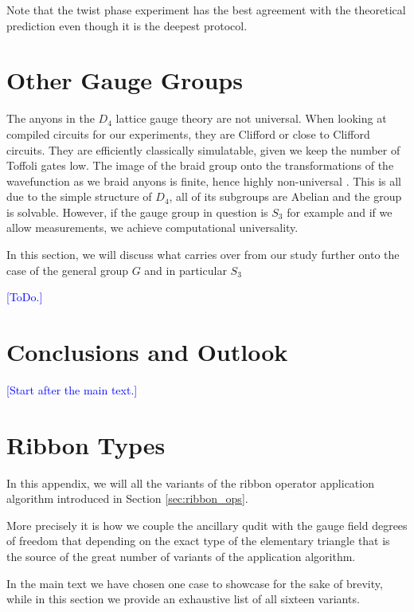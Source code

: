 \documentclass[two column]{article}
\newcommand{\jovan}[1]{\textcolor{blue}{[#1]}}
\begin{document}
Note that the twist phase experiment has the best agreement with the theoretical prediction even though it is the deepest protocol.

\section{Other Gauge Groups}

The anyons in the $D_4$ lattice gauge theory are not universal. 
When looking at compiled circuits for our experiments, they are Clifford or close to Clifford circuits.
They are efficiently classically simulatable, given we keep the number of Toffoli gates low.
The image of the braid group onto the transformations of the wavefunction as we braid anyons is finite, hence highly non-universal \cite{}.
This is all due to the simple structure of $D_4$, all of its subgroups are Abelian and the group is solvable.
However, if the gauge group in question is $S_3$ for example and if we allow measurements, we achieve computational universality.

In this section, we will discuss what carries over from our study further onto the case of the general group $G$ and in particular $S_3$

\jovan{ToDo.}



\section{Conclusions and Outlook}

\jovan{Start after the main text.}




\FloatBarrier
\onecolumn
\appendix

\section{Ribbon Types}\label{app:ribs}


In this appendix, we will all the variants of the ribbon operator application algorithm introduced in Section \ref{sec:ribbon_ops}.

More precisely it is how we couple the ancillary qudit with the gauge field degrees of freedom that depending on the exact type of the elementary triangle that is the source of the great number of variants of the application algorithm. 

In the main text we have chosen one case to showcase for the sake of brevity, while in this section we provide an exhaustive list of all sixteen variants.
\end{document}
